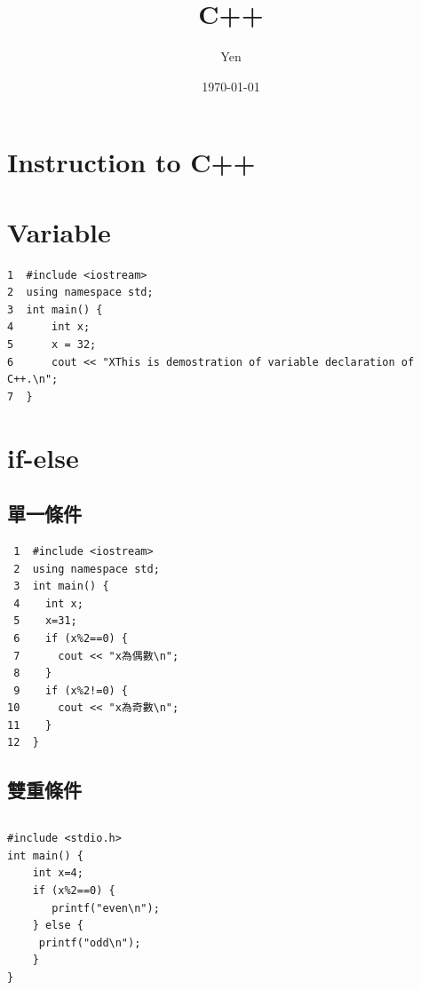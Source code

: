 \documentclass[12pt,a4paper]{article}
\author{Yen}
\date{\today}
\title{C++}
\begin{document}
\maketitle
\setcounter{tocdepth}{4}
\tableofcontents


\section*{Instruction to C++}
\label{sec:org1d4fb45}

\section*{Variable}
\label{sec:org69a6c85}

\begin{verbatim}
1  #include <iostream>
2  using namespace std;
3  int main() {
4      int x;
5      x = 32;
6      cout << "XThis is demostration of variable declaration of C++.\n";
7  }
\end{verbatim}

\section*{if-else}
\label{sec:org0772404}

\subsection*{單一條件}
\label{sec:org17f1eaf}
\begin{verbatim}
 1  #include <iostream>
 2  using namespace std;
 3  int main() {
 4    int x;
 5    x=31;
 6    if (x%2==0) {
 7      cout << "x為偶數\n";
 8    }
 9    if (x%2!=0) {
10      cout << "x為奇數\n";
11    }
12  }
\end{verbatim}

\subsection*{雙重條件}
\label{sec:org290cf4e}

\subsection*{}
\label{sec:org9010c20}
\begin{verbatim}
#include <stdio.h>
int main() {
    int x=4;
    if (x%2==0) {
       printf("even\n");
    } else {
     printf("odd\n");
    }
}
\end{verbatim}
\end{document}
